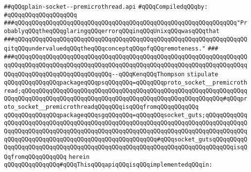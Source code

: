\label{src/lib/std/src/socket/plain-socket--premicrothread.api}
\verb|##qQQqplain-socket--premicrothread.api|\newline
\newline
\verb|#qQQqCompiledqQQqby:|\newline
\verb|#qQQqqQQqqQQqqQQqqQQq|\newline
\newline
\newline
\newline
\verb|###qQQqqQQqqQQqqQQqqQQqqQQqqQQqqQQqqQQqqQQqqQQqqQQqqQQqqQQqqQQqqQQq"ProbablyqQQqtheqQQqglaringqQQqerrorqQQqinqQQqUnixqQQqwasqQQqthat|\newline
\verb|###qQQqqQQqqQQqqQQqqQQqqQQqqQQqqQQqqQQqqQQqqQQqqQQqqQQqqQQqqQQqqQQqqQQqitqQQqundervaluedqQQqtheqQQqconceptqQQqofqQQqremoteness."|\newline
\verb|###|\newline
\verb|###qQQqqQQqqQQqqQQqqQQqqQQqqQQqqQQqqQQqqQQqqQQqqQQqqQQqqQQqqQQqqQQqqQQqqQQqqQQqqQQqqQQqqQQqqQQqqQQqqQQqqQQqqQQqqQQqqQQqqQQqqQQqqQQqqQQqqQQqqQQqqQQqqQQqqQQqqQQqqQQqqQQqqQQq--qQQqKenqQQqThompson|\newline
\newline
\newline
\newline
\verb|stipulate|\newline
\verb|qQQqqQQqqQQqqQQqpackageqQQqpsqQQqqQQq=qQQqqQQqproto_socket__premicrothread;qQQqqQQqqQQqqQQqqQQqqQQqqQQqqQQqqQQqqQQqqQQqqQQqqQQqqQQqqQQqqQQqqQQqqQQqqQQqqQQqqQQqqQQqqQQqqQQqqQQqqQQqqQQqqQQqqQQqqQQqqQQqqQQq#qQQqproto_socket__premicrothreadqQQqqQQqisqQQqfromqQQqqQQqqQQq|\newline
\verb|qQQqqQQqqQQqqQQqpackageqQQqsgqQQqqQQq=qQQqqQQqsocket_guts;qQQqqQQqqQQqqQQqqQQqqQQqqQQqqQQqqQQqqQQqqQQqqQQqqQQqqQQqqQQqqQQqqQQqqQQqqQQqqQQqqQQqqQQqqQQqqQQqqQQqqQQqqQQqqQQqqQQqqQQqqQQqqQQqqQQqqQQqqQQqqQQqqQQqqQQqqQQqqQQqqQQqqQQqqQQqqQQqqQQqqQQqqQQqqQQqqQQq#qQQqsocket_gutsqQQqqQQqqQQqqQQqqQQqqQQqqQQqqQQqqQQqqQQqqQQqqQQqqQQqqQQqqQQqqQQqqQQqqQQqqQQqisqQQqfromqQQqqQQqqQQq|\newline
\verb|herein|\newline
\newline
\verb|qQQqqQQqqQQqqQQq#qQQqThisqQQqapiqQQqisqQQqimplementedqQQqin:|\newline
